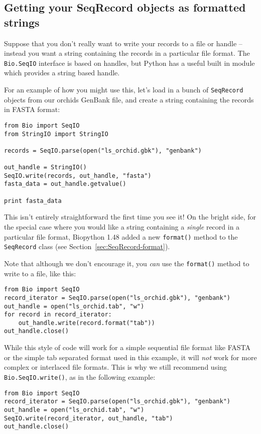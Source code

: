 \documentclass{report}
\begin{document}
\subsection{Getting your SeqRecord objects as formatted strings}
\label{sec:Bio.SeqIO-and-StringIO}
Suppose that you don't really want to write your records to a file or handle -- instead you want a string containing the records in a particular file format.  The \verb|Bio.SeqIO| interface is based on handles, but Python has a useful built in module which provides a string based handle.

For an example of how you might use this, let's load in a bunch of \verb|SeqRecord| objects from our orchids GenBank file, and create a string containing the records in FASTA format:

\begin{verbatim}
from Bio import SeqIO
from StringIO import StringIO

records = SeqIO.parse(open("ls_orchid.gbk"), "genbank")

out_handle = StringIO()
SeqIO.write(records, out_handle, "fasta")
fasta_data = out_handle.getvalue()

print fasta_data
\end{verbatim}

This isn't entirely straightforward the first time you see it!  On the bright side, for the special case where you would like a string containing a \emph{single} record in a particular file format, Biopython 1.48 added a new \verb|format()| method to the \verb|SeqRecord| class (see Section~\ref{sec:SeqRecord-format}).

Note that although we don't encourage it, you \emph{can} use the \verb|format()| method to write to a file, like this:
\begin{verbatim}
from Bio import SeqIO
record_iterator = SeqIO.parse(open("ls_orchid.gbk"), "genbank")
out_handle = open("ls_orchid.tab", "w")
for record in record_iterator:
    out_handle.write(record.format("tab"))
out_handle.close()
\end{verbatim}
\noindent While this style of code will work for a simple sequential file format like FASTA or the simple tab separated format used in this example, it will \emph{not} work for more complex or interlaced file formats.  This is why we still recommend using \verb|Bio.SeqIO.write()|, as in the following example:
\begin{verbatim}
from Bio import SeqIO
record_iterator = SeqIO.parse(open("ls_orchid.gbk"), "genbank")
out_handle = open("ls_orchid.tab", "w")
SeqIO.write(record_iterator, out_handle, "tab")
out_handle.close()
\end{verbatim}
\end{document}
